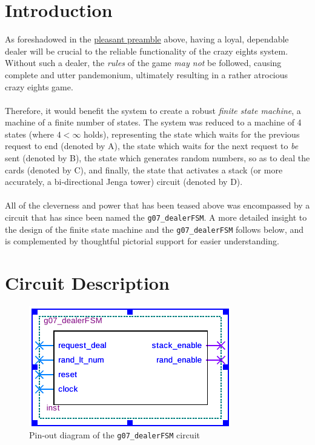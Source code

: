\documentclass[12pt]{report}
\begin{document}
\chapter*{Introduction}
As foreshadowed in the \hyperref[s:preamble]{pleasant preamble} above, having a loyal, dependable
dealer will be crucial to the reliable functionality of the crazy eights system. Without such a
dealer, the \textit{rules} of the game \textit{may not} be followed, causing complete and utter
pandemonium, ultimately resulting in a rather atrocious crazy eights game.\\\\
Therefore, it would benefit the system to create a robust \textit{finite state machine}, a machine
of a finite number of states. The system was reduced to a machine of 4 states (where $4 < \infty$
holds), representing the state which waits for the previous request to end (denoted by A), the state
which waits for the next request to \textit{be} sent (denoted by B), the state which generates
random numbers, so as to deal the cards (denoted by C), and finally, the state that activates a
stack (or more accurately, a bi-directional Jenga tower) circuit (denoted by D). \\\\
All of the cleverness and power that has been teased above was encompassed by a circuit that has
since been named the \texttt{g07\_dealerFSM}. A more detailed insight to the design of the finite
state machine and the \texttt{g07\_dealerFSM} follows below, and is complemented by thoughtful
pictorial support for easier understanding.

\chapter*{Circuit Description}

\begin{figure}[h]
	\begin{center}
		\caption{Pin-out diagram of the \texttt{g07\_dealerFSM} circuit}
		\includegraphics[scale=1.3]{dealer_symb}
	\end{center}
\end{figure}
\end{document}
